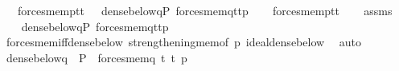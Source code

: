 \begin{isabellebody}
\ \ \ {\isachardoublequoteopen}forces{\isacharunderscore}{\kern0pt}mem{\isacharparenleft}{\kern0pt}p{\isacharcomma}{\kern0pt}t{}{\isacharcomma}{\kern0pt}t{}{\isacharparenright}{\kern0pt}\ \ {\isasymlongleftrightarrow}\ dense{\isacharunderscore}{\kern0pt}below{\isacharparenleft}{\kern0pt}{\isacharbraceleft}{\kern0pt}q{\isasymin}P{\isachardot}{\kern0pt}\ forces{\isacharunderscore}{\kern0pt}mem{\isacharparenleft}{\kern0pt}q{\isacharcomma}{\kern0pt}t{}{\isacharcomma}{\kern0pt}t{}{\isacharparenright}{\kern0pt}{\isacharbraceright}{\kern0pt}{\isacharcomma}{\kern0pt}p{\isacharparenright}{\kern0pt}{\isachardoublequoteclose}\isanewline
%
\isadelimproof
%
\endisadelimproof
%
\isatagproof
{}\isamarkupfalse%
\isanewline
\ \ \isamarkupfalse%
\ {\isachardoublequoteopen}forces{\isacharunderscore}{\kern0pt}mem{\isacharparenleft}{\kern0pt}p{\isacharcomma}{\kern0pt}t{}{\isacharcomma}{\kern0pt}t{}{\isacharparenright}{\kern0pt}{\isachardoublequoteclose}\isanewline
\ \ \isamarkupfalse%
\ assms\isanewline
\ \ \isamarkupfalse%
\ {\isachardoublequoteopen}dense{\isacharunderscore}{\kern0pt}below{\isacharparenleft}{\kern0pt}{\isacharbraceleft}{\kern0pt}q{\isasymin}P{\isachardot}{\kern0pt}\ forces{\isacharunderscore}{\kern0pt}mem{\isacharparenleft}{\kern0pt}q{\isacharcomma}{\kern0pt}t{}{\isacharcomma}{\kern0pt}t{}{\isacharparenright}{\kern0pt}{\isacharbraceright}{\kern0pt}{\isacharcomma}{\kern0pt}p{\isacharparenright}{\kern0pt}{\isachardoublequoteclose}\isanewline
\ \ \ \ \isamarkupfalse%
\ forces{\isacharunderscore}{\kern0pt}mem{\isacharunderscore}{\kern0pt}iff{\isacharunderscore}{\kern0pt}dense{\isacharunderscore}{\kern0pt}below\ strengthening{\isacharunderscore}{\kern0pt}mem{\isacharbrackleft}{\kern0pt}of\ p{\isacharbrackright}{\kern0pt}\ ideal{\isacharunderscore}{\kern0pt}dense{\isacharunderscore}{\kern0pt}below\ \isamarkupfalse%
\ auto\isanewline
{}\isamarkupfalse%
\isanewline
\ \ \isamarkupfalse%
\ {\isachardoublequoteopen}dense{\isacharunderscore}{\kern0pt}below{\isacharparenleft}{\kern0pt}{\isacharbraceleft}{\kern0pt}q\ {\isasymin}\ P\ {\isachardot}{\kern0pt}\ forces{\isacharunderscore}{\kern0pt}mem{\isacharparenleft}{\kern0pt}q{\isacharcomma}{\kern0pt}\ t{}{\isacharcomma}{\kern0pt}\ t{}{\isacharparenright}{\kern0pt}{\isacharbraceright}{\kern0pt}{\isacharcomma}{\kern0pt}\ p{\isacharparenright}{\kern0pt}{\isachardoublequoteclose}\isanewline

\end{isabellebody}
